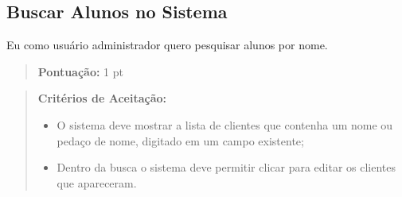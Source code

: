 \subsection[Buscar Alunos no Sistema]{Buscar Alunos no Sistema}
Eu como usuário administrador quero pesquisar alunos por nome.
\begin{quote}
    \textbf{Pontuação:} 1 pt
\end{quote}
\begin{quote}
\textbf{Critérios de Aceitação:}
    \begin{itemize}
        \item O sistema deve mostrar a lista de clientes que contenha um nome ou pedaço de
        nome, digitado em um campo existente;
        \item Dentro da busca o sistema deve permitir clicar para editar os clientes que
        apareceram.
    \end{itemize}
\end{quote}

